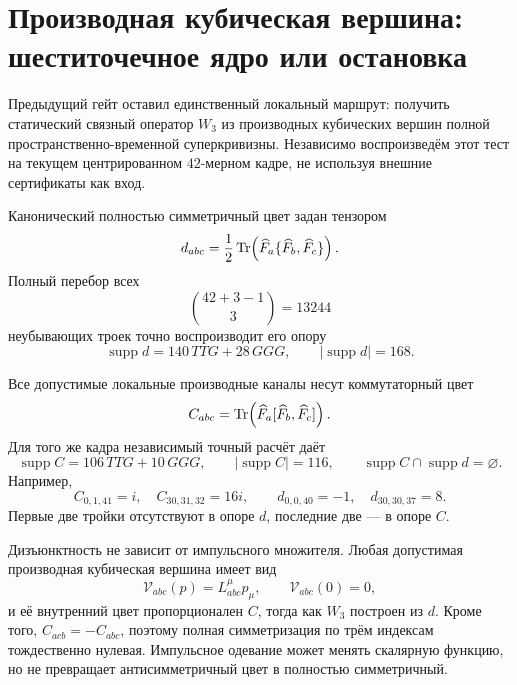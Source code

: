 \chapter{Производная кубическая вершина: шеститочечное ядро или остановка}
\label{ch:v8-baryon-derivative-cubic-vertex-to-six-point-kernel-or-stop-gate}

Предыдущий гейт оставил единственный локальный маршрут: получить статический
связный оператор $W_3$ из производных кубических вершин полной
пространственно-временной суперкривизны. Независимо воспроизведём этот тест
на текущем центрированном $42$-мерном кадре, не используя внешние
сертификаты как вход.

Канонический полностью симметричный цвет задан тензором
\begin{equation}
 d_{abc}=\frac12\operatorname{Tr}\!\left(\widehat F_a
 \{\widehat F_b,\widehat F_c\}\right).
 \label{eq:v8-baryon-derivative-symmetric-color}
\end{equation}
Полный перебор всех
\begin{equation}
 \binom{42+3-1}{3}=13244
 \label{eq:v8-baryon-derivative-triple-count}
\end{equation}
неубывающих троек точно воспроизводит его опору
\begin{equation}
 \operatorname{supp}d=140\,TTG+28\,GGG,
 \qquad |\operatorname{supp}d|=168.
 \label{eq:v8-baryon-derivative-d-support}
\end{equation}

Все допустимые локальные производные каналы несут коммутаторный цвет
\begin{equation}
 C_{abc}=\operatorname{Tr}\!\left(\widehat F_a
 [\widehat F_b,\widehat F_c]\right).
 \label{eq:v8-baryon-derivative-commutator-color}
\end{equation}
Для того же кадра независимый точный расчёт даёт
\begin{equation}
 \operatorname{supp}C=106\,TTG+10\,GGG,
 \qquad |\operatorname{supp}C|=116,
 \qquad \operatorname{supp}C\cap\operatorname{supp}d=\varnothing.
 \label{eq:v8-baryon-derivative-C-support}
\end{equation}
Например,
\begin{equation}
 C_{0,1,41}=i,\quad C_{30,31,32}=16i,
 \qquad d_{0,0,40}=-1,\quad d_{30,30,37}=8.
 \label{eq:v8-baryon-derivative-support-witnesses}
\end{equation}
Первые две тройки отсутствуют в опоре $d$, последние две --- в опоре $C$.

Дизъюнктность не зависит от импульсного множителя. Любая допустимая
производная кубическая вершина имеет вид
\begin{equation}
 \mathcal V_{abc}(p)=L_{abc}^{\mu}p_\mu,
 \qquad \mathcal V_{abc}(0)=0,
 \label{eq:v8-baryon-derivative-zero-momentum}
\end{equation}
и её внутренний цвет пропорционален $C$, тогда как $W_3$ построен из $d$.
Кроме того, $C_{acb}=-C_{abc}$, поэтому полная симметризация по трём
индексам тождественно нулевая. Импульсное одевание может менять скалярную
функцию, но не превращает антисимметричный цвет в полностью симметричный.

